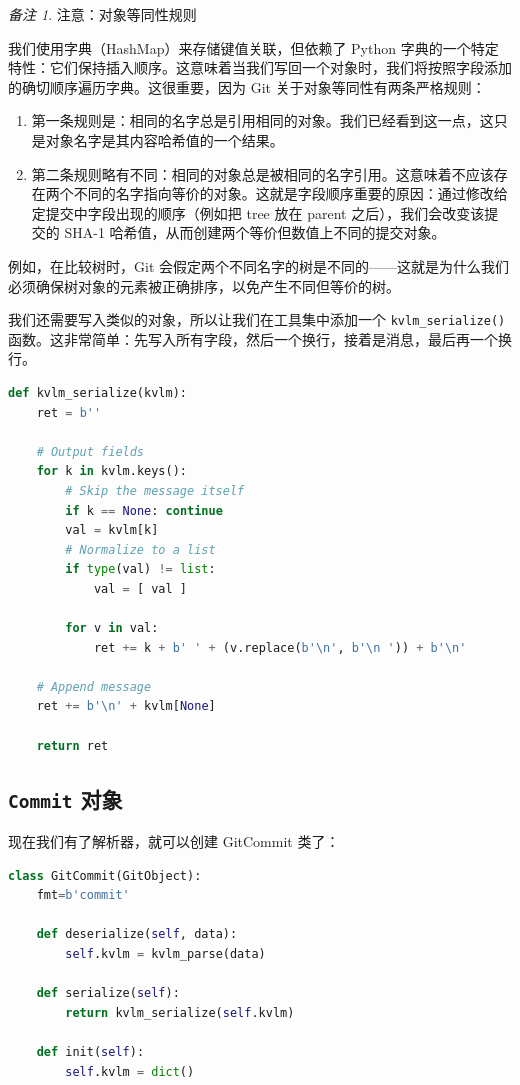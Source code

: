 \documentclass{ctexart}
\theoremstyle{remark}
\newtheorem*{remark}{备注}
\theoremstyle{warningstyle}
\theoremstyle{warningstyle}
\begin{document}
\begin{remark}
注意：对象等同性规则

我们使用字典（HashMap）来存储键值关联，但依赖了 Python 字典的一个特定特性：它们保持插入顺序。这意味着当我们写回一个对象时，我们将按照字段添加的确切顺序遍历字典。这很重要，因为 Git 关于对象等同性有两条严格规则：
\begin{enumerate}
    \item 第一条规则是：相同的名字总是引用相同的对象。我们已经看到这一点，这只是对象名字是其内容哈希值的一个结果。
    \item 第二条规则略有不同：相同的对象总是被相同的名字引用。这意味着不应该存在两个不同的名字指向等价的对象。这就是字段顺序重要的原因：通过修改给定提交中字段出现的顺序（例如把 tree 放在 parent 之后），我们会改变该提交的 SHA-1 哈希值，从而创建两个等价但数值上不同的提交对象。
\end{enumerate}
例如，在比较树时，Git 会假定两个不同名字的树是不同的——这就是为什么我们必须确保树对象的元素被正确排序，以免产生不同但等价的树。
\end{remark}
我们还需要写入类似的对象，所以让我们在工具集中添加一个 \lstinline|kvlm_serialize()| 函数。这非常简单：先写入所有字段，然后一个换行，接着是消息，最后再一个换行。
\begin{lstlisting}[language=Python]
def kvlm_serialize(kvlm):
    ret = b''

    # Output fields
    for k in kvlm.keys():
        # Skip the message itself
        if k == None: continue
        val = kvlm[k]
        # Normalize to a list
        if type(val) != list:
            val = [ val ]

        for v in val:
            ret += k + b' ' + (v.replace(b'\n', b'\n ')) + b'\n'

    # Append message
    ret += b'\n' + kvlm[None]

    return ret
\end{lstlisting}

\cprotect\subsection{\verb|Commit| 对象}
现在我们有了解析器，就可以创建 GitCommit 类了：
\begin{lstlisting}[language=Python]
class GitCommit(GitObject):
    fmt=b'commit'

    def deserialize(self, data):
        self.kvlm = kvlm_parse(data)

    def serialize(self):
        return kvlm_serialize(self.kvlm)

    def init(self):
        self.kvlm = dict()
\end{lstlisting}
\end{document}

